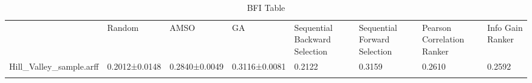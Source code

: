 \begin{table*}[h]
\caption{BFI Table}
\label{tbl:bfi}\begin{tabular}{llllllll}
\noalign{\smallskip}\hline\noalign{\smallskip}
&Random&AMSO&GA&Sequential Backward Selection&Sequential Forward Selection&Pearson Correlation Ranker&Info Gain Ranker\\\noalign{\smallskip}\hline
Hill_Valley_sample.arff&0.2012±0.0148&0.2840±0.0049&0.3116±0.0081&0.2122&0.3159&0.2610&0.2592\\
\noalign{\smallskip}\hline
\end{tabular}
\end{table*}